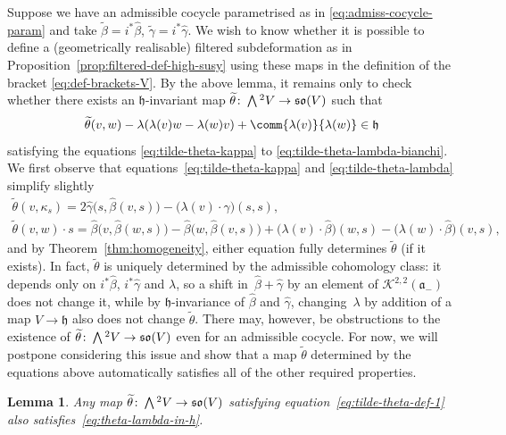 \documentclass[pdftex]{sigma}
\numberwithin{equation}{section}
\newtheorem{Lemma}[Theorem]{Lemma}
\newcommand{\fa}{\mathfrak{a}}
\newcommand{\fh}{\mathfrak{h}}
\newcommand{\fso}{\mathfrak{so}}
\newcommand{\cK}{\mathcal{K}}
\newcommand{\betahat}{\widehat{\beta}}
\newcommand{\gammahat}{\widehat{\gamma}}
\newcommand{\betatilde}{\widetilde{\beta}}
\newcommand{\gammatilde}{\widetilde{\gamma}}
\newcommand{\thetatilde}{\widetilde{\theta}}
\newcommand{\Wedge}{\mathchoice{{\textstyle\bigwedge}}{\bigwedge}{\bigwedge}{\bigwedge}}	%
\newcommand{\1}{\mathbbm{1}}
\begin{document}
Suppose we have an admissible cocycle parametrised as in \eqref{eq:admiss-cocycle-param} and take $\betatilde=i^*\betahat$, $\gammatilde=i^*\gammahat$. We wish to know whether it is possible to define a (geometrically realisable) filtered subdeformation as in Proposition~\ref{prop:filtered-def-high-susy} using these maps in the definition of the bracket \eqref{eq:def-brackets-V}. By the above lemma, it remains only to check whether there exists an $\fh$-invariant map $\thetatilde\colon \Wedge^2V\to \fso(V)$ such that
\begin{equation}\label{eq:theta-lambda-in-h}
	\thetatilde(v,w) - \lambda(\lambda(v)w-\lambda(w)v) + \comm{\lambda(v)}{\lambda(w)} \in \fh
\end{equation}
satisfying the equations \eqref{eq:tilde-theta-kappa} to \eqref{eq:tilde-theta-lambda-bianchi}. We first observe that equations~\eqref{eq:tilde-theta-kappa} and \eqref{eq:tilde-theta-lambda} simplify slightly
\begin{gather}
	\thetatilde(v,\kappa_s) = 2\gammahat\bigl(s,\betahat(v,s)\bigr) - \bigl(\lambda(v)\cdot\gammahat\bigr)(s,s),
	\label{eq:tilde-theta-def-1}\\
		\thetatilde(v,w)\cdot s
		= \betahat\bigl(v,\betahat(w,s)\bigr) - \betahat\bigl(w,\betahat(v,s)\bigr) + \bigl(\lambda(v)\cdot\betahat\bigr)(w,s) - \bigl(\lambda(w)\cdot\betahat\bigr)(v,s),
		\label{eq:tilde-theta-act-s}
\end{gather}
and by Theorem~\ref{thm:homogeneity}, either equation fully determines $\thetatilde$ (if it exists). In fact, $\thetatilde$ is uniquely determined by the admissible cohomology class: it depends only on $i^*\betahat$, $i^*\gammahat$ and $\lambda$, so a shift in~${\betahat+\gammahat}$ by an element of $\cK^{2,2}(\fa_-)$ does not change it, while by $\fh$-invariance of $\betahat$ and $\gammahat$, changing~$\lambda$ by addition of a map $V\to\fh$ also does not change $\thetatilde$. There may, however, be obstructions to the existence of $\thetatilde\colon\Wedge^2 V\to \fso(V)$ even for an admissible cocycle. For now, we will postpone considering this issue and show that a map $\thetatilde$ determined by the equations above automatically satisfies all of the other required properties.

\begin{Lemma}\label{lemma:theta-lambda-in-h}
	Any map $\thetatilde\colon\Wedge^2V\to \fso(V)$ satisfying equation~\eqref{eq:tilde-theta-def-1} also satisfies~\eqref{eq:theta-lambda-in-h}.
\end{Lemma}
\end{document}
